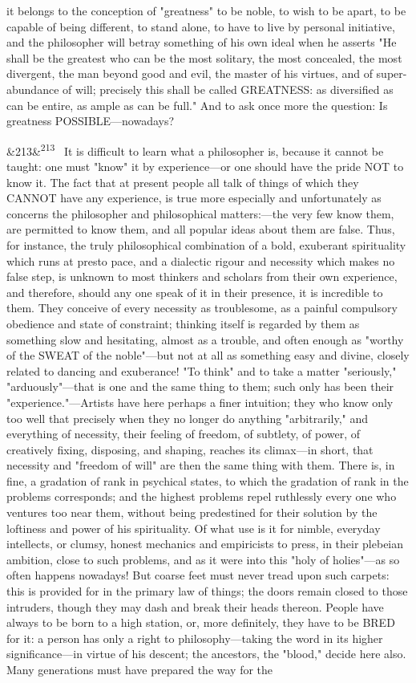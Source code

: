 \documentclass[12pt]{article}
\newcommand{\para}[1][]{\par\noindent\ifx&#1&\else\textsuperscript{\footnotesize #1}~\fi}
\begin{document}
it belongs to the conception of "greatness" to be noble, to wish to be apart, to be capable of being different, to stand alone, to have to live by personal initiative, and the philosopher will betray something of his own ideal when he asserts "He shall be the greatest who can be the most solitary, the most concealed, the most divergent, the man beyond good and evil, the master of his virtues, and of super-abundance of will; precisely this shall be called GREATNESS: as diversified as can be entire, as ample as can be full." And to ask once more the question: Is greatness POSSIBLE---nowadays?

\para[213] It is difficult to learn what a philosopher is, because it cannot be taught: one must "know" it by experience---or one should have the pride NOT to know it. The fact that at present people all talk of things of which they CANNOT have any experience, is true more especially and unfortunately as concerns the philosopher and philosophical matters:---the very few know them, are permitted to know them, and all popular ideas about them are false. Thus, for instance, the truly philosophical combination of a bold, exuberant spirituality which runs at presto pace, and a dialectic rigour and necessity which makes no false step, is unknown to most thinkers and scholars from their own experience, and therefore, should any one speak of it in their presence, it is incredible to them. They conceive of every necessity as troublesome, as a painful compulsory obedience and state of constraint; thinking itself is regarded by them as something slow and hesitating, almost as a trouble, and often enough as "worthy of the SWEAT of the noble"---but not at all as something easy and divine, closely related to dancing and exuberance! "To think" and to take a matter "seriously," "arduously"---that is one and the same thing to them; such only has been their "experience."---Artists have here perhaps a finer intuition; they who know only too well that precisely when they no longer do anything "arbitrarily," and everything of necessity, their feeling of freedom, of subtlety, of power, of creatively fixing, disposing, and shaping, reaches its climax---in short, that necessity and "freedom of will" are then the same thing with them. There is, in fine, a gradation of rank in psychical states, to which the gradation of rank in the problems corresponds; and the highest problems repel ruthlessly every one who ventures too near them, without being predestined for their solution by the loftiness and power of his spirituality. Of what use is it for nimble, everyday intellects, or clumsy, honest mechanics and empiricists to press, in their plebeian ambition, close to such problems, and as it were into this "holy of holies"---as so often happens nowadays! But coarse feet must never tread upon such carpets: this is provided for in the primary law of things; the doors remain closed to those intruders, though they may dash and break their heads thereon. People have always to be born to a high station, or, more definitely, they have to be BRED for it: a person has only a right to philosophy---taking the word in its higher significance---in virtue of his descent; the ancestors, the "blood," decide here also. Many generations must have prepared the way for the 
\end{document}
